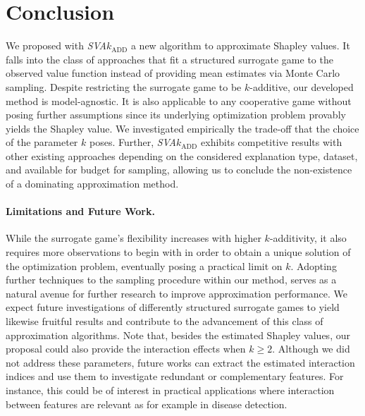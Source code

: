 \section{Conclusion}
\label{sec:conclusion}

We proposed with \emph{SVA}$k_{\text{ADD}}$ a new algorithm to approximate Shapley values.
It falls into the class of approaches that fit a structured surrogate game to the observed value function instead of providing mean estimates via Monte Carlo sampling.
Despite restricting the surrogate game to be $k$-additive, our developed method is model-agnostic.
It is also applicable to any cooperative game without posing further assumptions since its underlying optimization problem provably yields the Shapley value.
We investigated empirically the trade-off that the choice of the parameter $k$ poses.
Further, \emph{SVA}$k_{\text{ADD}}$ exhibits competitive results with other existing approaches depending on the considered explanation type, dataset, and available for budget for sampling, allowing us to conclude the non-existence of a dominating approximation method.

\paragraph{Limitations and Future Work.}

While the surrogate game's flexibility increases with higher $k$-additivity, it also requires more observations to begin with in order to obtain a unique solution of the optimization problem, eventually posing a practical limit on $k$.
Adopting further techniques to the sampling procedure within our method, serves as a natural avenue for further research to improve approximation performance.
We expect future investigations of differently structured surrogate games to yield likewise fruitful results and contribute to the advancement of this class of approximation algorithms. 
Note that, besides the estimated Shapley values, our proposal could also provide the interaction effects when $k \geq 2$.
Although we did not address these parameters, future works can extract the estimated interaction indices and use them to investigate redundant or complementary features.
For instance, this could be of interest in practical applications where interaction between features are relevant as for example in disease detection.